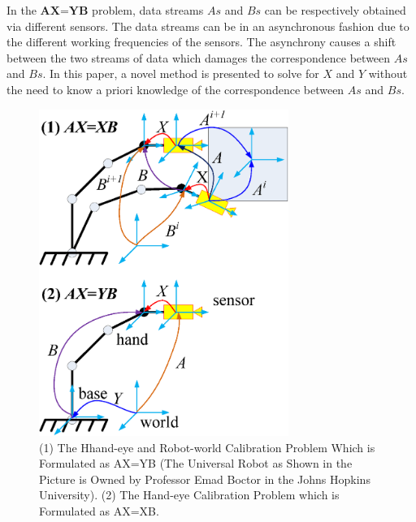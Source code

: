 \documentclass[letterpaper, 10 pt, conference]{ieeeconf}  %
\begin{document}
In the $\textbf{AX=YB}$ problem, data streams $As$ and $Bs$ can be respectively obtained via different sensors. The data streams can be in an asynchronous fashion due to the different working frequencies of the sensors. The asynchrony causes a shift between the two streams of data which damages the correspondence between $As$ and $Bs$. In this paper, a novel method is presented to solve for $X$ and $Y$ without the need to know a priori knowledge of the correspondence between $As$ and $Bs$.

\begin{center}
\begin{figure}[htbp]
\centering
\includegraphics[width=3.2in]{fig1.eps}
\caption{
(1) The Hhand-eye and Robot-world Calibration Problem Which is Formulated as AX=YB (The Universal Robot as Shown in the Picture is Owned by Professor Emad Boctor in the Johns Hopkins University). (2) The Hand-eye Calibration Problem which is Formulated as AX=XB.
}
\label{fig1}
\end{figure}
\end{center}
\end{document}
